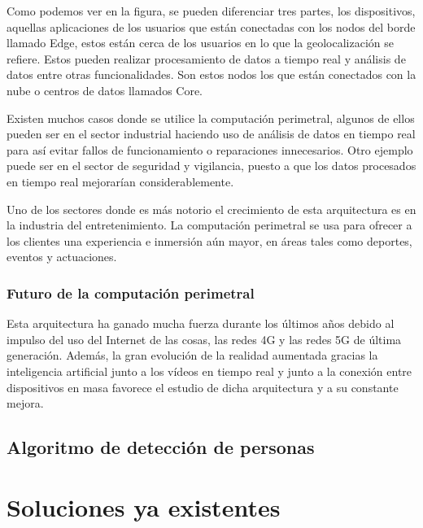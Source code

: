 Como podemos ver en la figura, se pueden diferenciar tres partes, los dispositivos, aquellas aplicaciones de los usuarios que están conectadas con los nodos del borde llamado Edge, estos están cerca de los usuarios en lo que la geolocalización se refiere. Estos pueden realizar procesamiento de datos a tiempo real y análisis de datos entre otras funcionalidades. Son estos nodos los que están conectados con la nube o centros de datos llamados Core.

Existen muchos casos donde se utilice la computación perimetral, algunos de ellos pueden ser en el sector industrial haciendo uso de análisis de datos en tiempo real para así evitar fallos de funcionamiento o reparaciones innecesarios. Otro ejemplo puede ser en el sector de seguridad y vigilancia, puesto a que los datos procesados en tiempo real mejorarían considerablemente.

Uno de los sectores donde es más notorio el crecimiento de esta arquitectura es en la industria del entretenimiento. La computación perimetral se usa para ofrecer a los clientes una experiencia e inmersión aún mayor, en áreas tales como deportes, eventos y actuaciones.

\subsubsection{Futuro de la computación perimetral}
Esta arquitectura ha ganado mucha fuerza durante los últimos años debido al impulso del uso del Internet de las cosas, las redes 4G y las redes 5G de última generación. Además, la gran evolución de la realidad aumentada gracias la inteligencia artificial junto a los vídeos en tiempo real y junto a la conexión entre dispositivos en masa favorece el estudio de dicha arquitectura y a su constante mejora.


\subsection{Algoritmo de detección de personas}

\section{Soluciones ya existentes}